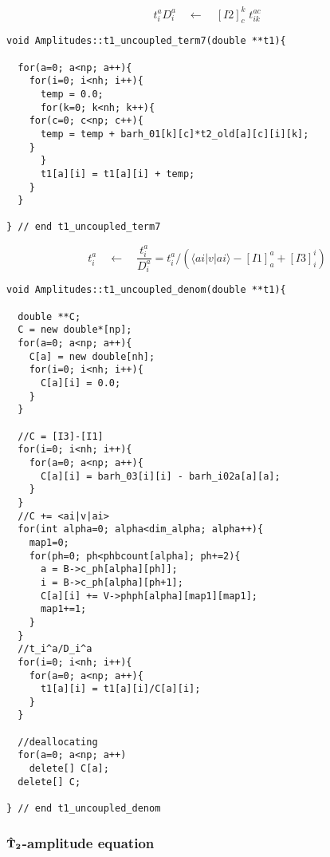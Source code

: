 \begin{equation*}
t_i^aD_i^a\quad \leftarrow \quad [I2]_c^k\phantom{.}t_{ik}^{ac}
\end{equation*}
\begin{lstlisting}[label={list:impl:t1term7},caption={implementation of the amp1 class function t1\_uncoupled\_term7()}]
void Amplitudes::t1_uncoupled_term7(double **t1){
  
  for(a=0; a<np; a++){
    for(i=0; i<nh; i++){
      temp = 0.0;
      for(k=0; k<nh; k++){
	for(c=0; c<np; c++){
	  temp = temp + barh_01[k][c]*t2_old[a][c][i][k];
	}
      }
      t1[a][i] = t1[a][i] + temp;
    }
  }

} // end t1_uncoupled_term7
\end{lstlisting}

\begin{equation*}
t_i^a\quad \leftarrow \quad \frac{t_i^a}{D_i^a}=t_i^a/\left(\langle ai|v|ai \rangle-[I1]_a^a+[I3]_i^i\right)
\end{equation*}

\begin{lstlisting}[label={list:impl:t1denom},caption={implementation of the amp1 class function t1\_uncoupled\_denom()}]
void Amplitudes::t1_uncoupled_denom(double **t1){
  
  double **C;
  C = new double*[np];
  for(a=0; a<np; a++){
    C[a] = new double[nh];
    for(i=0; i<nh; i++){
      C[a][i] = 0.0;
    }
  }
  
  //C = [I3]-[I1]
  for(i=0; i<nh; i++){
    for(a=0; a<np; a++){
      C[a][i] = barh_03[i][i] - barh_i02a[a][a];
    }
  }
  //C += <ai|v|ai>
  for(int alpha=0; alpha<dim_alpha; alpha++){
    map1=0;
    for(ph=0; ph<phbcount[alpha]; ph+=2){
      a = B->c_ph[alpha][ph]];
      i = B->c_ph[alpha][ph+1];
      C[a][i] += V->phph[alpha][map1][map1];
      map1+=1;
    }
  }
  //t_i^a/D_i^a
  for(i=0; i<nh; i++){
    for(a=0; a<np; a++){
      t1[a][i] = t1[a][i]/C[a][i];
    }
  }
  
  //deallocating
  for(a=0; a<np; a++)
    delete[] C[a];
  delete[] C;
  
} // end t1_uncoupled_denom
\end{lstlisting}

\subsubsection{$\bf \hat{T}_2$-amplitude equation}

